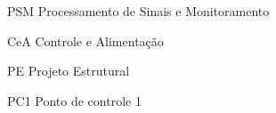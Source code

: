 \begin{siglas}
  \item[PSM] Processamento de Sinais e Monitoramento
  \item[CeA] Controle e Alimentação
  \item[PE] Projeto Estrutural
  \item[PC1] Ponto de controle 1
\end{siglas}
